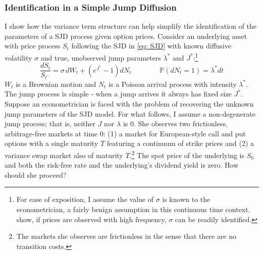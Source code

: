 \documentclass[12pt]{article}
\begin{document}
\subsubsection{Identification in a Simple Jump Diffusion}\label{subsubsec: theory_SJD}
I show how the variance term structure can help simplify the identification of the parameters of a SJD process given option prices. Consider an underlying asset with price process $S_t$ following the SJD in \eqref{eq: SJD} with known diffusive volatility $\sigma$ and true, unobserved jump parameters $\lambda^*$ and $J^*$:\footnote{For ease of exposition, I assume the value of $\sigma$ is known to the econometrician, a fairly benign assumption in this continuous time context. \cite{barndorff2004power} show, if prices are observed with high frequency, $\sigma$ can be readily identified. } 
\begin{equation}\label{eq: SJD}
    \frac{dS_t}{S_{t^-}} = \sigma \, dW_t + \left( e^{J^*} - 1 \right) dN_t \qquad \qquad \mathbb{P}(dN_t = 1) = \lambda^* dt
\end{equation}
$W_t$ is a Brownian motion and $N_t$ is a Poisson arrival process with intensity $\lambda^*$. The jump process is simple - when a jump arrives it always has fixed size $J^*$. Suppose an econometrician is faced with the problem of recovering the unknown jump parameters of the SJD model. For what follows, I assume a non-degenerate jump process; that is, neither $J$ nor $\lambda$ is 0. She observes two frictionless, arbitrage-free markets at time 0: (1) a market for European-style call and put options with a single maturity $T$ featuring a continuum of strike prices and (2) a variance swap market also of maturity $T$.\footnote{The markets she observes are frictionless in the sense that there are no transition costs.} The spot price of the underlying is $S_0$ and both the risk-free rate and the underlying's dividend yield is zero.  How should she proceed?
\end{document}
